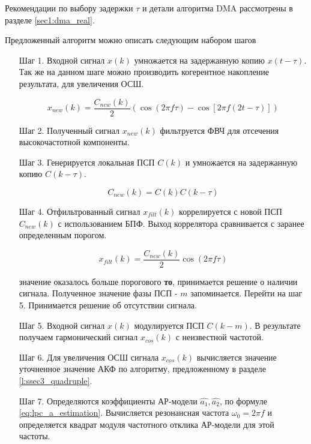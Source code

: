 Рекомендации по выбору задержки ${\tau}$ и детали алгоритма DMA рассмотрены в разделе
\ref{sec1:dma_real}.

Предложенный алгоритм можно описать следующим набором шагов
\begin{itemize}
\item[Шаг 1.] Входной сигнал ${x(k)}$ умножается на задержанную копию ${x(t-\tau)}$. Так же
	на данном шаге можно производить когерентное накопление результата, для
	увеличения ОСШ.

	\begin{center}
	\begin{equation}
		x_{new}(k) = \frac{C_{new}(k)}{2} \left(\cos (2\pi f \tau) - \cos \left[2 \pi f (2t - \tau)\right]\right)
	\end{equation}
	\end{center}

\item[Шаг 2.] Полученный сигнал ${x_{new}(k)}$ фильтруется ФВЧ для отсечения высокочастотной компоненты.
\item[Шаг 3.] Генерируется локальная ПСП ${C(k)}$ и умножается на задержанную копию ${C(k-\tau)}$.

	\begin{center}
	\begin{equation}
		C_{new}(k) = C(k)C(k-\tau)
	\end{equation}
	\end{center}

\item[Шаг 4.] Отфильтрованный сигнал ${x_{filt}(k)}$ коррелируется с новой ПСП ${C_{new}(k)}$
	с использованием БПФ. Выход коррелятора сравнивается с заранее определенным порогом.

	\begin{center}
	\begin{equation}
		x_{filt}(k) = \frac{C_{new}(k)}{2} \cos (2\pi f \tau)
	\end{equation}
	\end{center}

	  значение оказалось больше порогового {\bf{то}},
		принимается решение о наличии сигнала. Полученное значение фазы ПСП  - ${m}$ запоминается.
		Перейти на шаг 5.
		Принимается решение об отсутствии сигнала.
\item[Шаг 5.] Входной сигнал ${x(k)}$ модулируется ПСП ${C(k-m)}$. В результате получаем гармонический
	сигнал ${x_{cos}(k)}$ с неизвестной частотой.
\item[Шаг 6.] Для увеличения ОСШ сигнала ${x_{cos}(k)}$ вычисляется значение уточненное значение АКФ
	по алгоритму, предложенному в разделе \ref{l:ssec3_quadruple}.
\item[Шаг 7.] Определяются коэффициенты АР-модели ${\hat{a_1}, \hat{a_2}}$, по формуле \ref{eq:lpc_a_estimation}. 
	Вычисляется резонансная частота ${\omega_0 = 2 \pi f}$ и определяется квадрат модуля частотного отклика АР-модели для этой частоты. 
\end{itemize}

